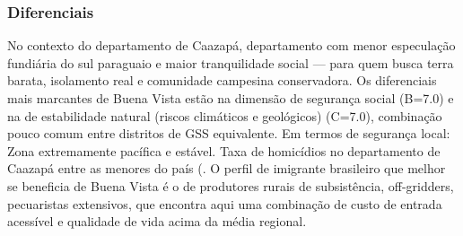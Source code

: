 \subsubsection*{Diferenciais}\label{dif-buena-vista-0603}
No contexto do departamento de Caazapá, departamento com menor especulação fundiária do sul paraguaio e maior tranquilidade social — para quem busca terra barata, isolamento real e comunidade campesina conservadora. Os diferenciais mais marcantes de Buena Vista estão na dimensão de segurança social (B=7.0) e na de estabilidade natural (riscos climáticos e geológicos) (C=7.0), combinação pouco comum entre distritos de GSS equivalente. Em termos de segurança local: Zona extremamente pacífica e estável. Taxa de homicídios no departamento de Caazapá entre as menores do país (. O perfil de imigrante brasileiro que melhor se beneficia de Buena Vista é o de produtores rurais de subsistência, off-gridders, pecuaristas extensivos, que encontra aqui uma combinação de custo de entrada acessível e qualidade de vida acima da média regional.
